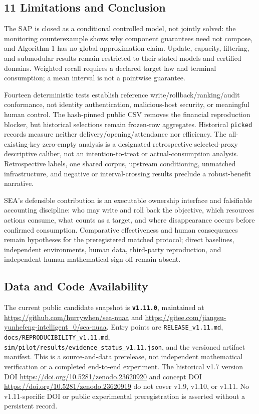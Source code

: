 \documentclass[
  11pt]{article}
\begin{document}
\subsection{11 Limitations and
Conclusion}\label{limitations-and-conclusion}

The SAP is closed as a conditional controlled model, not jointly solved:
the monitoring counterexample shows why component guarantees need not
compose, and Algorithm 1 has no global approximation claim. Update,
capacity, filtering, and submodular results remain restricted to their
stated models and certified domains. Weighted recall requires a declared
target law and terminal consumption; a mean interval is not a pointwise
guarantee.

Fourteen deterministic tests establish reference
write/rollback/ranking/audit conformance, not identity authentication,
malicious-host security, or meaningful human control. The hash-pinned
public CSV removes the financial reproduction blocker, but historical
selections remain frozen-row aggregates. Historical \texttt{picked}
records measure neither delivery/opening/attendance nor efficiency. The
all-existing-key zero-empty analysis is a designated retrospective
selected-proxy descriptive caliber, not an intention-to-treat or
actual-consumption analysis. Retrospective labels, one shared corpus,
upstream conditioning, unmatched infrastructure, and negative or
interval-crossing results preclude a robust-benefit narrative.

SEA's defensible contribution is an executable ownership interface and
falsifiable accounting discipline: who may write and roll back the
objective, which resources actions consume, what counts as a target, and
where disappearance occurs before confirmed consumption. Comparative
effectiveness and human consequences remain hypotheses for the
preregistered matched protocol; direct baselines, independent
environments, human data, third-party reproduction, and independent
human mathematical sign-off remain absent.

\subsection{Data and Code
Availability}\label{data-and-code-availability}

The current public candidate snapshot is \textbf{\texttt{v1.11.0}},
maintained at \url{https://github.com/hurrywhen/sea-nuaa} and
\url{https://gitee.com/jiangsu-yunhefeng-intelligent_0/sea-nuaa}. Entry
points are \texttt{RELEASE\_v1.11.md},
\texttt{docs/REPRODUCIBILITY\_v1.11.md},
\texttt{sim/pilot/results/evidence\_status\_v1.11.json}, and the
versioned artifact manifest. This is a source-and-data prerelease, not
independent mathematical verification or a completed end-to-end
experiment. The historical v1.7 version DOI
\url{https://doi.org/10.5281/zenodo.23620920} and concept DOI
\url{https://doi.org/10.5281/zenodo.23620919} do not cover v1.9, v1.10,
or v1.11. No v1.11-specific DOI or public experimental preregistration
is asserted without a persistent record.
\end{document}
